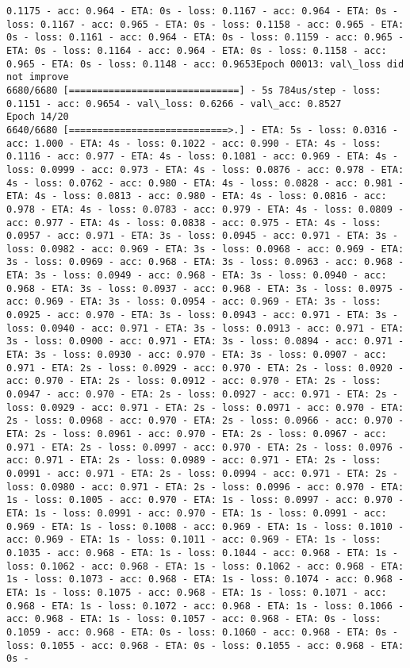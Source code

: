 \documentclass[11pt]{article}
\begin{document}
\begin{Verbatim}[commandchars=\\\{\}]
0.1175 - acc: 0.964 - ETA: 0s - loss: 0.1167 - acc: 0.964 - ETA: 0s - loss: 0.1167 - acc: 0.965 - ETA: 0s - loss: 0.1158 - acc: 0.965 - ETA: 0s - loss: 0.1161 - acc: 0.964 - ETA: 0s - loss: 0.1159 - acc: 0.965 - ETA: 0s - loss: 0.1164 - acc: 0.964 - ETA: 0s - loss: 0.1158 - acc: 0.965 - ETA: 0s - loss: 0.1148 - acc: 0.9653Epoch 00013: val\_loss did not improve
6680/6680 [==============================] - 5s 784us/step - loss: 0.1151 - acc: 0.9654 - val\_loss: 0.6266 - val\_acc: 0.8527
Epoch 14/20
6640/6680 [============================>.] - ETA: 5s - loss: 0.0316 - acc: 1.000 - ETA: 4s - loss: 0.1022 - acc: 0.990 - ETA: 4s - loss: 0.1116 - acc: 0.977 - ETA: 4s - loss: 0.1081 - acc: 0.969 - ETA: 4s - loss: 0.0999 - acc: 0.973 - ETA: 4s - loss: 0.0876 - acc: 0.978 - ETA: 4s - loss: 0.0762 - acc: 0.980 - ETA: 4s - loss: 0.0828 - acc: 0.981 - ETA: 4s - loss: 0.0813 - acc: 0.980 - ETA: 4s - loss: 0.0816 - acc: 0.978 - ETA: 4s - loss: 0.0783 - acc: 0.979 - ETA: 4s - loss: 0.0809 - acc: 0.977 - ETA: 4s - loss: 0.0838 - acc: 0.975 - ETA: 4s - loss: 0.0957 - acc: 0.971 - ETA: 3s - loss: 0.0945 - acc: 0.971 - ETA: 3s - loss: 0.0982 - acc: 0.969 - ETA: 3s - loss: 0.0968 - acc: 0.969 - ETA: 3s - loss: 0.0969 - acc: 0.968 - ETA: 3s - loss: 0.0963 - acc: 0.968 - ETA: 3s - loss: 0.0949 - acc: 0.968 - ETA: 3s - loss: 0.0940 - acc: 0.968 - ETA: 3s - loss: 0.0937 - acc: 0.968 - ETA: 3s - loss: 0.0975 - acc: 0.969 - ETA: 3s - loss: 0.0954 - acc: 0.969 - ETA: 3s - loss: 0.0925 - acc: 0.970 - ETA: 3s - loss: 0.0943 - acc: 0.971 - ETA: 3s - loss: 0.0940 - acc: 0.971 - ETA: 3s - loss: 0.0913 - acc: 0.971 - ETA: 3s - loss: 0.0900 - acc: 0.971 - ETA: 3s - loss: 0.0894 - acc: 0.971 - ETA: 3s - loss: 0.0930 - acc: 0.970 - ETA: 3s - loss: 0.0907 - acc: 0.971 - ETA: 2s - loss: 0.0929 - acc: 0.970 - ETA: 2s - loss: 0.0920 - acc: 0.970 - ETA: 2s - loss: 0.0912 - acc: 0.970 - ETA: 2s - loss: 0.0947 - acc: 0.970 - ETA: 2s - loss: 0.0927 - acc: 0.971 - ETA: 2s - loss: 0.0929 - acc: 0.971 - ETA: 2s - loss: 0.0971 - acc: 0.970 - ETA: 2s - loss: 0.0968 - acc: 0.970 - ETA: 2s - loss: 0.0966 - acc: 0.970 - ETA: 2s - loss: 0.0961 - acc: 0.970 - ETA: 2s - loss: 0.0967 - acc: 0.971 - ETA: 2s - loss: 0.0997 - acc: 0.970 - ETA: 2s - loss: 0.0976 - acc: 0.971 - ETA: 2s - loss: 0.0989 - acc: 0.971 - ETA: 2s - loss: 0.0991 - acc: 0.971 - ETA: 2s - loss: 0.0994 - acc: 0.971 - ETA: 2s - loss: 0.0980 - acc: 0.971 - ETA: 2s - loss: 0.0996 - acc: 0.970 - ETA: 1s - loss: 0.1005 - acc: 0.970 - ETA: 1s - loss: 0.0997 - acc: 0.970 - ETA: 1s - loss: 0.0991 - acc: 0.970 - ETA: 1s - loss: 0.0991 - acc: 0.969 - ETA: 1s - loss: 0.1008 - acc: 0.969 - ETA: 1s - loss: 0.1010 - acc: 0.969 - ETA: 1s - loss: 0.1011 - acc: 0.969 - ETA: 1s - loss: 0.1035 - acc: 0.968 - ETA: 1s - loss: 0.1044 - acc: 0.968 - ETA: 1s - loss: 0.1062 - acc: 0.968 - ETA: 1s - loss: 0.1062 - acc: 0.968 - ETA: 1s - loss: 0.1073 - acc: 0.968 - ETA: 1s - loss: 0.1074 - acc: 0.968 - ETA: 1s - loss: 0.1075 - acc: 0.968 - ETA: 1s - loss: 0.1071 - acc: 0.968 - ETA: 1s - loss: 0.1072 - acc: 0.968 - ETA: 1s - loss: 0.1066 - acc: 0.968 - ETA: 1s - loss: 0.1057 - acc: 0.968 - ETA: 0s - loss: 0.1059 - acc: 0.968 - ETA: 0s - loss: 0.1060 - acc: 0.968 - ETA: 0s - loss: 0.1055 - acc: 0.968 - ETA: 0s - loss: 0.1055 - acc: 0.968 - ETA: 0s - 
\end{Verbatim}
\end{document}
